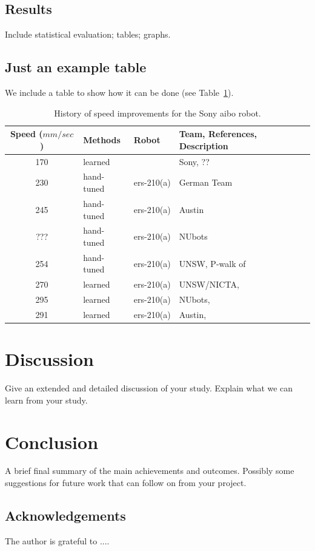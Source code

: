 \documentclass[a4,12pt]{article}
\newenvironment{boxit}{\begin{lrbox}{\savepar}
        \begin{minipage}[b]{4.6in}}
        {\end{minipage}\end{lrbox}\fbox{\usebox{\savepar}}}
\begin{document}
\subsection{Results}
%
Include statistical evaluation; tables; graphs.
\subsection{Just an example table}
We include a table to show how it can be done (see Table~\ref{table:ListOfVelocities}).
%
\begin{table}[h!]
\begin{center}
\leavevmode
\small %
\begin{tabular}{|cll|l|}\hline
%
%
Speed (${mm}/{sec}$) & Methods & Robot & Team, References, Description\\[0.1cm]\hline
%
170& learned & & Sony, \citep{HornbyEtAl1999}??\\%
%
230& hand-tuned & {\sc ers}-210(a) & German Team  \\%
%
245& hand-tuned & {\sc ers}-210(a) &Austin  \\%
%
???& hand-tuned & {\sc ers}-210(a) &NUbots  \\%
%
254& hand-tuned & {\sc ers}-210(a) &UNSW, P-walk of \citep{HengstEtAl2001}\\%
%
270& learned & {\sc ers}-210(a) &UNSW/NICTA, \citep{KimUther2003}\\%
%
295& learned & {\sc ers}-210(a) &NUbots,
\citep{QuinlanChalupMiddletonACRA2003}\\%
%
291& learned & {\sc ers}-210(a) &Austin, \citep{KohlStone2004}\\\hline
%
\end{tabular}
\end{center}
\caption{History of speed improvements for the Sony {\sc aibo}
robot.} \label{table:ListOfVelocities}
\end{table}
%
\section{Discussion}
%
Give an extended and detailed discussion of your study. Explain what we can learn from your study.
%
\section{Conclusion}
%
A brief final summary of the main achievements and outcomes. Possibly some suggestions for future work that can follow on from your project.%
%
\subsection*{Acknowledgements}
The author is grateful to ....
%
\vskip 0.2in


\end{document}
